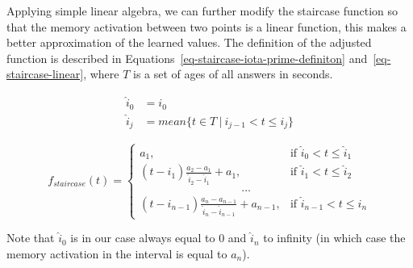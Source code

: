 Applying simple linear algebra, we can further modify the staircase function so that the memory activation between two points is a linear function, this makes a better approximation of the learned values. The definition of the adjusted function is described in Equations~\ref{eq-staircase-iota-prime-definiton} and~\ref{eq-staircase-linear}, where $T$ is a set of ages of all answers in seconds.

\begin{equation} \label{eq-staircase-iota-prime-definiton}
\begin{split}
  \hat{i}_0 &= i_0 \\
  \hat{i}_j &= \mathit{mean}\{t \in T~|~i_{j-1} < t \leq i_j\}
\end{split}
\end{equation}

\begin{equation} \label{eq-staircase-linear}
  f_{\mathit{staircase}}(t) = \begin{cases}
            a_1, & \text{if } \hat{i}_0 < t \leq \hat{i}_1 \\
            (t - \hat{i}_1) \frac{a_2 - a_1}{\hat{i}_2 - \hat{i}_1} + a_1, & \text{if } \hat{i}_1 < t \leq \hat{i}_2 \\
            \hspace{9em} \dots \\
            (t - \hat{i}_{n-1}) \frac{a_n - a_{n-1}}{\hat{i}_n - \hat{i}_{n-1}} + a_{n-1}, & \text{if } \hat{i}_{n-1} < t \leq \hat{i}_n     
         \end{cases}
\end{equation}

Note that $\hat{i}_0$ is in our case always equal to $0$ and $\hat{i}_n$ to infinity (in which case the memory activation in the interval is equal to $a_n$).
